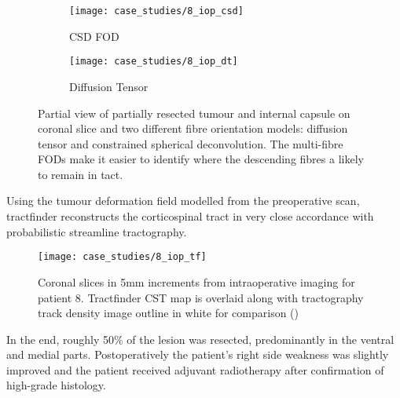 \begin{figure}
  \begin{subfigure}{0.45\textwidth}
    \centering
    \texttt{[image: case\_studies/8\_iop\_csd]}
    \caption{CSD FOD}
    \label{fig:8i_csd}
  \end{subfigure}%
  \begin{subfigure}{0.45\textwidth}
    \centering
    \texttt{[image: case\_studies/8\_iop\_dt]}
    \caption{Diffusion Tensor}
    \label{fig:8i_dt}
  \end{subfigure}
  \caption{Partial view of partially resected tumour and internal capsule on coronal slice and two different fibre orientation models: diffusion tensor and constrained spherical deconvolution. The multi-fibre FODs make it easier to identify where the descending fibres a likely to remain in tact.}
  \label{fig:8i_fod}
\end{figure}

Using the tumour deformation field modelled from the preoperative scan, tractfinder reconstructs the corticospinal tract in very close accordance with probabilistic streamline tractography.

\begin{figure}
  \texttt{[image: case\_studies/8\_iop\_tf]}
  \caption{Coronal slices in 5mm increments from intraoperative imaging for patient 8. Tractfinder CST map is overlaid along with tractography track density image outline in white for comparison ()}
  \label{fig:8i_tf}
\end{figure}

In the end, roughly 50\% of the lesion was resected, predominantly in the ventral and medial parts.
Postoperatively the patient's right side weakness was slightly improved and the patient received adjuvant radiotherapy  after confirmation of high-grade histology.
